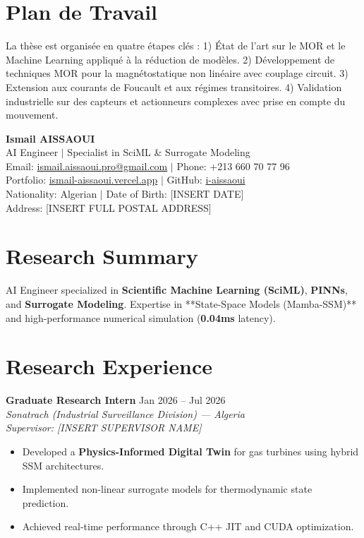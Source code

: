 \documentclass[a4paper,11pt]{article}
\begin{document}
\section{Plan de Travail}
La thèse est organisée en quatre étapes clés : 1) État de l'art sur le MOR et le Machine Learning appliqué à la réduction de modèles. 2) Développement de techniques MOR pour la magnétostatique non linéaire avec couplage circuit. 3) Extension aux courants de Foucault et aux régimes transitoires. 4) Validation industrielle sur des capteurs et actionneurs complexes avec prise en compte du mouvement.

\newpage

\begin{center}
    {\Huge\bfseries\color{ugagreen} Ismail AISSAOUI}\\[4pt]
    {\large AI Engineer $|$ Specialist in SciML \& Surrogate Modeling}\\[6pt]
    \normalsize
    Email: \href{mailto:ismail.aissaoui.pro@gmail.com}{ismail.aissaoui.pro@gmail.com} $|$ Phone: +213 660 70 77 96 \\
    Portfolio: \href{https://ismail-aissaoui.vercel.app}{ismail-aissaoui.vercel.app} $|$ GitHub: \href{https://github.com/i-aissaoui}{i-aissaoui} \\
    Nationality: Algerian $|$ Date of Birth: [INSERT DATE] \\
    Address: [INSERT FULL POSTAL ADDRESS]
\end{center}

\section{Research Summary}
AI Engineer specialized in \textbf{Scientific Machine Learning (SciML)}, \textbf{PINNs}, and \textbf{Surrogate Modeling}. Expertise in **State-Space Models (Mamba-SSM)** and high-performance numerical simulation (\textbf{0.04ms} latency).

\section{Research Experience}
\textbf{Graduate Research Intern} \hfill Jan 2026 -- Jul 2026 \\
\textit{Sonatrach (Industrial Surveillance Division) — Algeria} \\
\textit{Supervisor: [INSERT SUPERVISOR NAME]}
\begin{itemize}
    \item Developed a \textbf{Physics-Informed Digital Twin} for gas turbines using hybrid SSM architectures.
    \item Implemented non-linear surrogate models for thermodynamic state prediction.
    \item Achieved real-time performance through C++ JIT and CUDA optimization.
\end{itemize}
\end{document}
